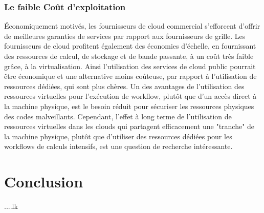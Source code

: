 \subsubsection{Le faible Coût d’exploitation }
 Économiquement motivés, les fournisseurs de cloud commercial s'efforcent d'offrir de meilleures garanties de services par rapport aux fournisseurs de grille. Les fournisseurs de cloud profitent également des économies d'échelle, en fournissant des ressources de calcul, de stockage et de bande passante, à un coût très faible grâce, à la virtualisation. Ainsi l'utilisation des services de cloud public pourrait être économique et une alternative moins coûteuse, par rapport à l’utilisation de ressources dédiées, qui sont plus chères. Un des avantages de l'utilisation des ressources virtuelles pour l'exécution de workflow, plutôt que d'un accès direct à la machine physique, est le besoin réduit pour sécuriser les ressources physiques des codes malveillants. Cependant, l'effet à long terme de l'utilisation de ressources virtuelles dans les clouds qui partagent efficacement une "tranche" de la machine physique, plutôt que d'utiliser des ressources dédiées pour les workflows de calculs intensifs, est une question de recherche intéressante. 
\section{Conclusion }
....lk
